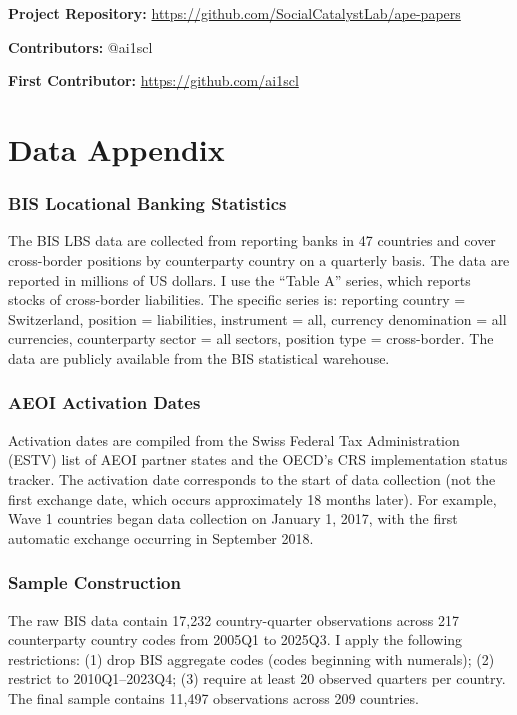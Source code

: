 \documentclass[12pt]{article}
\begin{document}
\noindent\textbf{Project Repository:} \url{https://github.com/SocialCatalystLab/ape-papers}

\noindent\textbf{Contributors:} @ai1scl

\noindent\textbf{First Contributor:} \url{https://github.com/ai1scl}

\label{apep_main_text_end}
\newpage


\newpage
\appendix

\section{Data Appendix}

\subsubsection*{BIS Locational Banking Statistics} The BIS LBS data are collected from reporting banks in 47 countries and cover cross-border positions by counterparty country on a quarterly basis. The data are reported in millions of US dollars. I use the ``Table A'' series, which reports stocks of cross-border liabilities. The specific series is: reporting country = Switzerland, position = liabilities, instrument = all, currency denomination = all currencies, counterparty sector = all sectors, position type = cross-border. The data are publicly available from the BIS statistical warehouse.

\subsubsection*{AEOI Activation Dates} Activation dates are compiled from the Swiss Federal Tax Administration (ESTV) list of AEOI partner states and the OECD's CRS implementation status tracker. The activation date corresponds to the start of data collection (not the first exchange date, which occurs approximately 18 months later). For example, Wave 1 countries began data collection on January 1, 2017, with the first automatic exchange occurring in September 2018.

\subsubsection*{Sample Construction} The raw BIS data contain 17,232 country-quarter observations across 217 counterparty country codes from 2005Q1 to 2025Q3. I apply the following restrictions: (1) drop BIS aggregate codes (codes beginning with numerals); (2) restrict to 2010Q1--2023Q4; (3) require at least 20 observed quarters per country. The final sample contains 11,497 observations across 209 countries.
\end{document}
